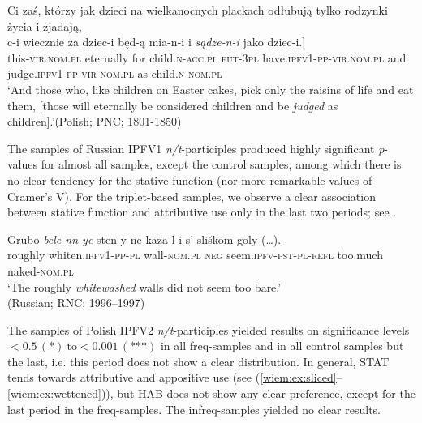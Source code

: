 \documentclass[output=paper]{langscibook}
\begin{document}
\ea\label{wiem:ex:judged}{{Ci zaś, którzy jak dzieci na wielkanocnych plackach odłubują tylko rodzynki życia i zjadają,}\\
\gll \minsp{[} {c-i} {wiecznie} {za} {dziec-i} {będ-ą} {mia-n-i} {i} {\textit{sądze-n-i}} {jako} {dziec-i.}]\\
{} this-\textsc{vir.nom.pl} eternally for child.\textsc{n-acc.pl} \textsc{fut-3pl} have.\textsc{ipfv1-pp-vir.nom.pl} and judge.\textsc{ipfv1-pp-vir-nom.pl} as child.\textsc{n-nom.pl}\\
\glt ‘And those who, like children on Easter cakes, pick only the raisins of life and eat them, [those will eternally be considered children and be \textit{judged} as children].’\hfill (Polish; PNC; 1801-1850)
}
\z

\noindent The samples of Russian IPFV1 \textit{n/t}-participles produced highly significant \textit{p}-values for almost all samples, except the control samples, among which there is no clear tendency for the stative function (nor more remarkable values of Cramer’s V). For the triplet-based samples, we observe a clear association between stative function and attributive use only in the last two periods; see .

\ea\label{wiem:ex:whitewashed}
\gll
{Grubo} {\textit{bele-nn-ye}} {sten-y} {ne} {kaza-l-i-s’} {sliškom} {goly (\dots).}\\
roughly whiten.\textsc{ipfv1-pp-pl} wall-\textsc{nom.pl} 
\textsc{neg} seem.\textsc{ipfv-pst-pl-refl} too.much naked-\textsc{nom.pl}\\
\glt‘The roughly \textit{whitewashed} walls did not seem too bare.’ \\
\hfill (Russian; RNC; 1996--1997)
\z

\noindent The samples of Polish IPFV2 \textit{n/t}-participles yielded results on significance levels ${}<0.5\,(\text{*})~\text{to}<0.001\,(\text{***})$ in all freq-samples and in all control samples but the last, i.e. this period does not show a clear distribution. In general, STAT tends towards attributive and appositive use (see (\ref{wiem:ex:sliced}--\ref{wiem:ex:wettened})), but HAB does not show any clear preference, except for the last period in the freq-samples. The infreq-samples yielded no clear results.\largerpage[-1]
\end{document}
